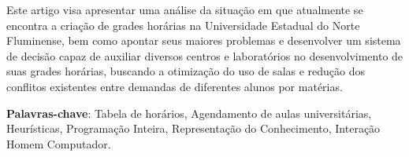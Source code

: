 \setlength{\absparsep}{18pt} %
\begin{resumo}

  Este artigo visa apresentar uma análise da situação em que atualmente se encontra a criação de grades horárias na Universidade Estadual do Norte Fluminense, bem como apontar seus maiores problemas e desenvolver um sistema de decisão capaz de auxiliar diversos centros e laboratórios no desenvolvimento de suas grades horárias, buscando a otimização do uso de salas e redução dos conflitos existentes entre demandas de diferentes alunos por matérias.

  \textbf{Palavras-chave}: Tabela de horários, Agendamento de aulas universitárias, Heurísticas, Programação Inteira, Representação do Conhecimento, Interação Homem Computador.

\end{resumo}
